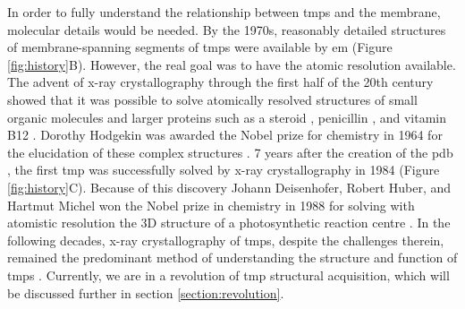 In order to fully understand the relationship between \gls{tmp}s and the membrane, molecular details would be needed.
By the 1970s, reasonably detailed structures of membrane\--spanning segments of \gls{tmp}s were available by \gls{em} \cite{Henderson1975} (Figure \ref{fig:history}B).
However, the real goal was to have the atomic resolution available.
The advent of x\--ray crystallography through the first half of the 20th century showed that it was possible to solve atomically resolved structures of small organic molecules \cite{Lonsdale1928, Dickinson1923} and larger proteins such as a steroid \cite{Carlisle1945}, penicillin \cite{Hodgekin1949}, and vitamin B12 \cite{HODGKIN1955}.
Dorothy Hodgekin was awarded the Nobel prize for chemistry in 1964 for the elucidation of these complex structures \cite{NobelMedia2018a}.
7 years after the creation of the \gls{pdb} \cite{Bernstein1978}, the first \gls{tmp} was successfully solved by x\--ray crystallography in 1984 \cite{Deisenhofer1984} (Figure \ref{fig:history}C).
Because of this discovery Johann Deisenhofer, Robert Huber, and Hartmut Michel won the Nobel prize in chemistry in 1988 for solving with atomistic resolution the 3D structure of a photosynthetic reaction centre \cite{NobelMedia2018}.
In the following decades, x\--ray crystallography of \gls{tmp}s, despite the challenges therein, remained the predominant method of understanding the structure and function of \gls{tmp}s \cite{Carpenter2008}.
Currently, we are in a revolution of \gls{tmp} structural acquisition, which will be discussed further in section \ref{section:revolution}.

